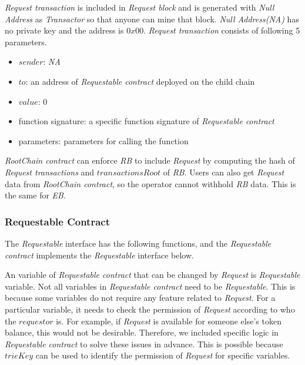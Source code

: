 \documentclass[letterpaper, 11pt]{article}
\begin{document}
\begin{CJK}{UTF8}{mj}
\begin{CJK}{UTF8}{mj}
\emph{Request transaction} is included in \emph{Request block} and is generated with \emph{Null Address} as \emph{Transactor} so that anyone can mine that block. \emph{Null Address(NA)} has no private key and the address is $0x00$.
\emph{Request transaction} consists of following 5 parameters.
\begin{itemize}
\item $sender$: \emph{NA}
\item $to$: an address of \emph{Requestable contract} deployed on the child chain
\item $value$: 0
\item function signature: a specific function signature of \emph{Requestable contract}
\item parameters: parameters for calling the function
\end{itemize}

\emph{RootChain contract} can enforce \emph{RB} to include \emph{Request} by computing the hash of \emph{Request transactions} and $transactionsRoot$ of \emph{RB}. Users can also get \emph{Request} data from \emph{RootChain contract}, so the operator cannot withhold \emph{RB} data. This is the same for \emph{EB}.
\end{CJK}

\subsubsection{Requestable Contract}
\begin{CJK}{UTF8}{mj}
The \emph{Requestable} interface has the following functions, and the \emph{Requestable contract} implements the \emph{Requestable} interface below.



An variable of \emph{Requestable contract} that can be changed by \emph{Request} is \emph{Requestable} variable. Not all variables in \emph{Requestable contract} need to be \emph{Requestable}. This is because some variables do not require any feature related to \emph{Request}. For a particular variable, it needs to check the permission of \emph{Request} according to who the $requestor$ is. For example, if \emph{Request} is available for someone else's token balance, this would not be desirable. Therefore, we included specific logic in \emph{Requestable contract} to solve these issues in advance. This is possible because $trieKey$ can be used to identify the permission of \emph{Request} for specific variables.


\end{CJK}
\end{CJK}
\end{document}
